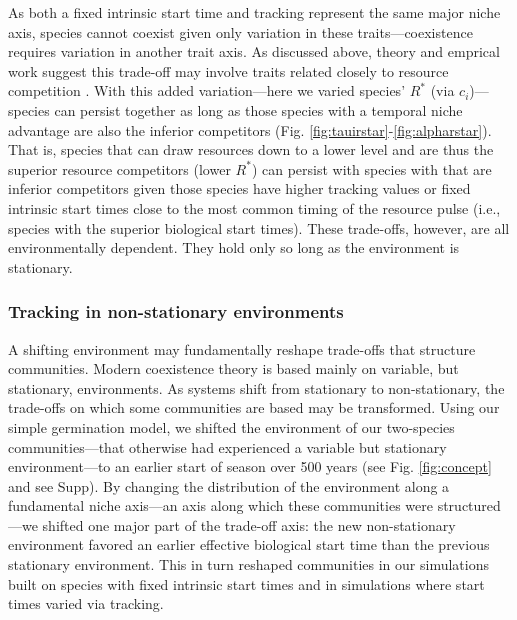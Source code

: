 \documentclass[11pt,letterpaper]{article}
\begin{document}
As both a fixed intrinsic start time and tracking represent the same major niche axis, species cannot coexist given only variation in these traits---coexistence requires variation in another trait axis. As discussed above, theory and emprical work suggest this trade-off may involve traits related closely to resource competition \citep{Chesson:2004eo}. With this added variation---here we varied species' $R^*$ (via $c_i$)---species can persist together as long as those species with a temporal niche advantage are also the inferior competitors (Fig. \ref{fig:tauirstar}-\ref{fig:alpharstar}). That is, species that can draw resources down to a lower level and are thus the superior resource competitors (lower $R^*$) can persist with species with that are inferior competitors given those species have higher tracking values or fixed intrinsic start times close to the most common timing of the resource pulse (i.e., species with the superior biological start times). These trade-offs, however, are all environmentally dependent. They hold only so long as the environment is stationary. 

\subsubsection{Tracking in non-stationary environments}
A shifting environment may fundamentally reshape trade-offs that structure communities. Modern coexistence theory is based mainly on variable, but stationary, environments. As systems shift from stationary to non-stationary, the trade-offs on which some communities are based may be transformed. Using our simple germination model, we shifted the environment of our two-species communities---that otherwise had experienced a variable but stationary environment---to an earlier start of season over 500 years (see Fig. \ref {fig:concept} and see Supp). By changing the distribution of the environment along a fundamental niche axis---an axis along which these communities were structured---we shifted one major part of the trade-off axis: the new non-stationary environment favored an earlier effective biological start time than the previous stationary environment. This in turn reshaped communities in our simulations built on species with fixed intrinsic start times and in simulations where start times varied via tracking. 
\end{document}
